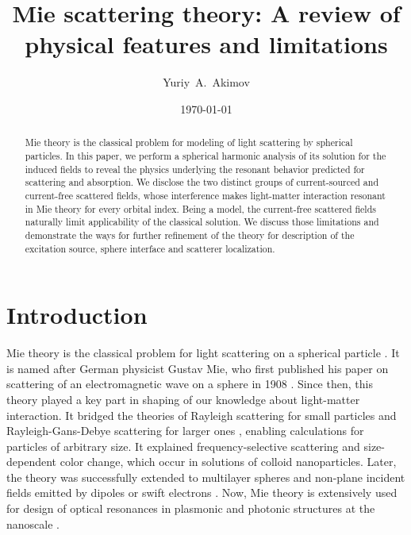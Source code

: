 \documentclass[aps,prb,reprint]{revtex4-2}
\begin{document}
\title{Mie scattering theory: A review of physical features and limitations}

\author{Yuriy~A.~Akimov}

\date{\today}

\begin{abstract} 
Mie theory is the classical problem for modeling of light scattering by spherical particles.    
In this paper, we perform a spherical harmonic analysis of its solution for the induced fields to reveal the physics underlying the resonant behavior predicted for scattering and absorption. 
We disclose the two distinct groups of current-sourced and current-free scattered fields, whose interference makes light-matter interaction resonant in Mie theory for every orbital index. 
Being a model, the current-free scattered fields naturally limit applicability of the classical solution. 
We discuss those limitations and demonstrate the ways for further refinement of the theory for description of the excitation source, sphere interface and scatterer localization. 
\end{abstract}

\maketitle

\section{Introduction}

Mie theory is the classical problem for light scattering on a spherical particle \cite{Stratton:2007,Jackson:1999,Bohren:1998}. 
It is named after German physicist Gustav Mie, who first published his paper on scattering of an electromagnetic wave on a sphere in 1908 \cite{Mie:1908}. 
Since then, this theory played a key part in shaping of our knowledge about light-matter interaction.
It bridged the theories of Rayleigh scattering for small particles and Rayleigh-Gans-Debye scattering for larger ones \cite{Strutt:1871}, enabling calculations for particles of arbitrary size. 
It explained frequency-selective scattering and size-dependent color change, which occur in solutions of colloid nanoparticles.
Later, the theory was successfully extended to multilayer spheres \cite{Aden:1951} and non-plane incident fields emitted by dipoles \cite{Ruppin:1982} or swift electrons \cite{deAbajo:1999}. 
Now, Mie theory is extensively used for design of optical resonances in plasmonic and photonic structures at the nanoscale \cite{Li:2014,Png:2017,Liu:2020,Menguc:2023}. 
\end{document}
